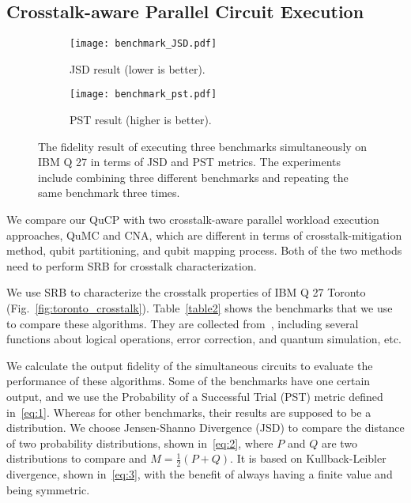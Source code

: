 \documentclass[conference]{IEEEtran}
\begin{document}
\subsection{Crosstalk-aware Parallel Circuit Execution}

\begin{figure}[h]
\begin{subfigure}{0.45\linewidth}
\centering
\texttt{[image: benchmark\_JSD.pdf]}
\caption{JSD result (lower is better).}
\label{fig:jsd}
\end{subfigure}
\begin{subfigure}{0.45\linewidth}
\centering
\texttt{[image: benchmark\_pst.pdf]}
\caption{PST result (higher is better).}
\label{fig:pst}
\end{subfigure}
\caption{The fidelity result of executing three benchmarks simultaneously on IBM Q 27 in terms of JSD and PST metrics. The experiments include combining three different benchmarks and repeating the same benchmark three times. }
\label{fig:crosstalk_algorithm}

\end{figure}

We compare our QuCP with two crosstalk-aware parallel workload execution approaches, QuMC and CNA, which are different in terms of crosstalk-mitigation method, qubit partitioning, and qubit mapping process. Both of the two methods need to perform SRB for crosstalk characterization. 

We use SRB to characterize the crosstalk properties of IBM Q 27 Toronto (Fig.~\ref{fig:toronto_crosstalk}). Table~\ref{table2} shows the benchmarks that we use to compare these algorithms. They are collected from~\cite{li2020qasmbench,wille2008revlib}, including several functions about logical operations, error correction, and quantum simulation, etc. 


We calculate the output fidelity of the simultaneous circuits to evaluate the performance of these algorithms. Some of the benchmarks have one certain output, and we use the Probability of a Successful Trial (PST) metric defined in~\eqref{eq:1}. Whereas for other benchmarks, their results are supposed to be a distribution. We choose Jensen-Shanno Divergence (JSD) to compare the distance of two probability distributions, shown in~\eqref{eq:2}, where $P$ and $Q$ are two distributions to compare and $M = \frac{1}{2}(P + Q)$. It is based on Kullback-Leibler divergence, shown in~\eqref{eq:3}, with the benefit of always having a finite value and being symmetric. 
\end{document}
